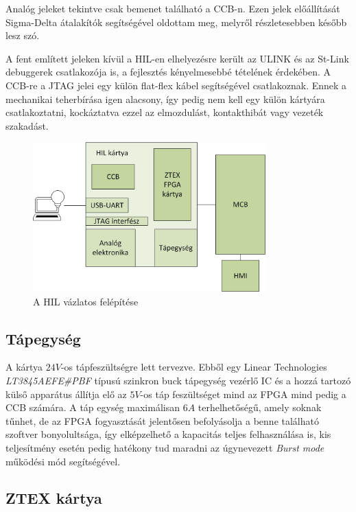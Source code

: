 Analóg jeleket tekintve csak bemenet található a CCB-n. Ezen jelek előállítását Sigma-Delta átalakítók segítségével oldottam meg, melyről részletesebben később lesz szó.

A fent említett jeleken kívül a HIL-en elhelyezésre került az ULINK és az St-Link debuggerek csatlakozója is, a fejlesztés kényelmesebbé tételének érdekében. A CCB-re a JTAG jelei egy külön flat-flex kábel segítségével csatlakoznak. Ennek a mechanikai teherbírása igen alacsony, így pedig nem kell egy külön kártyára csatlakoztatni, kockáztatva ezzel az elmozdulást, kontakthibát vagy vezeték szakadást.

\begin{figure}[!ht]
	\centering
	\includegraphics[width = 0.8\textwidth]{figures/hil.jpg}
	\caption{A HIL vázlatos felépítése} 
	\label{fig:hil_block}
\end{figure}

\subsection{Tápegység}
A kártya $24 V$-os tápfeszültségre lett tervezve. Ebből egy Linear Technologies \emph{LT3845AEFE#PBF} típusú szinkron buck tápegység vezérlő IC és a hozzá tartozó külső apparátus állítja elő az $5 V$-os táp feszültséget mind az FPGA mind pedig a CCB számára. A táp egység maximálisan $6 A$ terhelhetőségű, amely soknak tűnhet, de az FPGA fogyasztását jelentősen befolyásolja a benne található szoftver bonyolultsága, így elképzelhető a kapacitás teljes felhasználása is, kis teljesítmény esetén pedig hatékony tud maradni az úgynevezett \emph{Burst mode} működési mód segítségével.

\subsection{ZTEX kártya}

